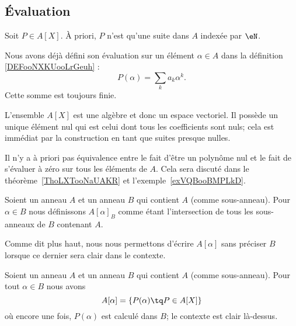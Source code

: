 \subsection{Évaluation}

Soit \( P\in A[X]\). À priori, \( P\) n'est qu'une suite dans \( A\) indexée par \( \eN\).


Nous avons déjà défini son évaluation sur un élément \( \alpha\in A\) dans la définition \ref{DEFooNXKUooLrGeuh} :
\begin{equation}
	P(\alpha)=\sum_ka_k\alpha^k.
\end{equation}
Cette somme est toujours finie.

\begin{normaltext}      \label{NORMooQFTJooLBcPxl}
	L'ensemble \( A[X]\) est une algèbre et donc un espace vectoriel. Il possède un unique élément nul qui est celui dont tous les coefficients sont nuls; cela est immédiat par la construction en tant que suites presque nulles.
\end{normaltext}

Il n'y a à priori pas équivalence entre le fait d'être un polynôme nul et le fait de s'évaluer à zéro sur tous les éléments de \( A\). Cela sera discuté dans le théorème~\ref{ThoLXTooNaUAKR} et l'exemple~\ref{exVQBooBMPLkD}.

\begin{definition}      \label{DEFooRFBFooKCXQsv}
	Soient un anneau \( A\) et un anneau \( B\) qui contient \( A\) (comme sous-anneau). Pour \( \alpha\in B\) nous définissons \( A[\alpha]_B\) comme étant l'intersection de tous les sous-anneaux de \( B\) contenant \( A\).
\end{definition}
Comme dit plus haut, nous nous permettons d'écrire \( A[\alpha]\) sans préciser \( B\) lorsque ce dernier sera clair dans le contexte.

\begin{proposition}     \label{PROPooPMNSooOkHOxJ}
	Soient un anneau \( A\) et un anneau \( B\) qui contient \( A\) (comme sous-anneau). Pour tout \( \alpha\in B\) nous avons
	\begin{equation}
		A[\alpha]=\{ P(\alpha)\tq P\in A[X] \}
	\end{equation}
	où encore une fois, \( P(\alpha)\) est calculé dans \( B\); le contexte est clair là-dessus.
\end{proposition}

